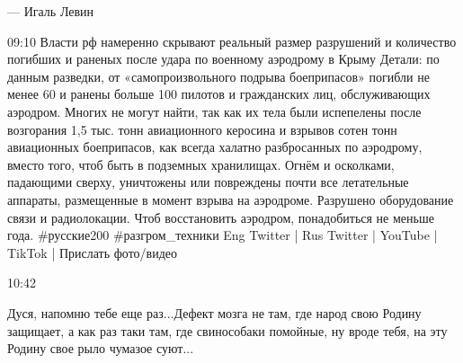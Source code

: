 {— Игаль Левин

09:10
Власти рф намеренно скрывают реальный размер разрушений и количество погибших и раненых после удара по военному аэродрому в Крыму
Детали: по данным разведки, от «самопроизвольного подрыва боеприпасов» погибли не менее 60 и ранены больше 100 пилотов и гражданских лиц, обслуживающих аэродром.
Многих не могут найти, так как их тела были испепелены после возгорания 1,5 тыс. тонн авиационного керосина и взрывов сотен тонн авиационных боеприпасов, как всегда халатно разбросанных по аэродрому, вместо того, чтоб быть в подземных хранилищах.
Огнём и осколками, падающими сверху, уничтожены или повреждены почти все летательные аппараты, размещенные в момент взрыва на аэродроме.
Разрушено оборудование связи и радиолокации.
Чтоб восстановить аэродром, понадобиться не меньше года.
#русские200
#разгром_техники
Eng Twitter | Rus Twitter | YouTube | TikTok | Прислать фото/видео

10:42

Дуся, напомню тебе еще раз...Дефект мозга не там, где народ свою Родину
защищает, а как раз таки там, где свинособаки помойные, ну вроде тебя, на эту
Родину свое рыло чумазое суют...

}
